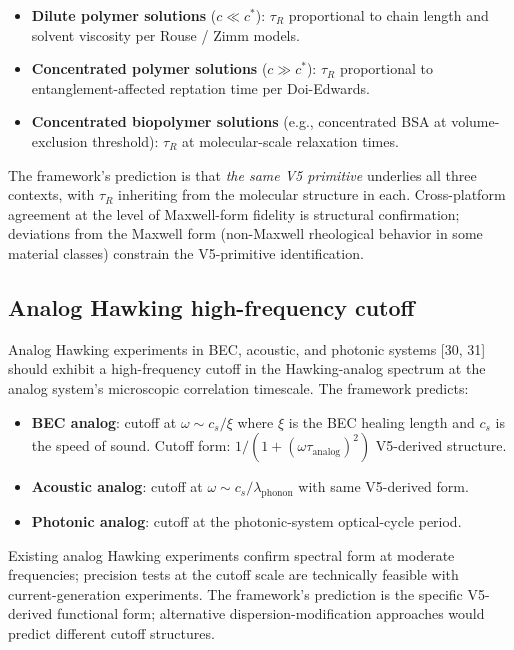 \documentclass[11pt,a4paper]{article}
\begin{document}
\begin{itemize}[noitemsep]
\item \textbf{Dilute polymer solutions} ($c \ll c^*$): $\tau_R$ proportional to chain length and solvent viscosity per Rouse / Zimm models.
\item \textbf{Concentrated polymer solutions} ($c \gg c^*$): $\tau_R$ proportional to entanglement-affected reptation time per Doi-Edwards.
\item \textbf{Concentrated biopolymer solutions} (e.g., concentrated BSA at volume-exclusion threshold): $\tau_R$ at molecular-scale relaxation times.
\end{itemize}

The framework's prediction is that \emph{the same V5 primitive} underlies all three contexts, with $\tau_R$ inheriting from the molecular structure in each. Cross-platform agreement at the level of Maxwell-form fidelity is structural confirmation; deviations from the Maxwell form (non-Maxwell rheological behavior in some material classes) constrain the V5-primitive identification.

\subsection{Analog Hawking high-frequency cutoff}

Analog Hawking experiments in BEC, acoustic, and photonic systems [30, 31] should exhibit a high-frequency cutoff in the Hawking-analog spectrum at the analog system's microscopic correlation timescale. The framework predicts:

\begin{itemize}[noitemsep]
\item \textbf{BEC analog}: cutoff at $\omega \sim c_s/\xi$ where $\xi$ is the BEC healing length and $c_s$ is the speed of sound. Cutoff form: $1/(1+(\omega\tau_\mathrm{analog})^{2})$ V5-derived structure.
\item \textbf{Acoustic analog}: cutoff at $\omega \sim c_s/\lambda_\mathrm{phonon}$ with same V5-derived form.
\item \textbf{Photonic analog}: cutoff at the photonic-system optical-cycle period.
\end{itemize}

Existing analog Hawking experiments confirm spectral form at moderate frequencies; precision tests at the cutoff scale are technically feasible with current-generation experiments. The framework's prediction is the specific V5-derived functional form; alternative dispersion-modification approaches would predict different cutoff structures.
\end{document}

